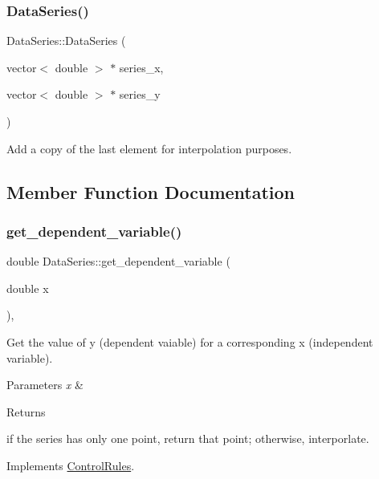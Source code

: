 \subsubsection{\texorpdfstring{Data\+Series()}{DataSeries()}}
{\footnotesize\ttfamily Data\+Series\+::\+Data\+Series (\begin{DoxyParamCaption}\item[{vector$<$ double $>$ $\ast$}]{series\+\_\+x,  }\item[{vector$<$ double $>$ $\ast$}]{series\+\_\+y }\end{DoxyParamCaption})}

Add a copy of the last element for interpolation purposes. 

\subsection{Member Function Documentation}
\mbox{\label{classDataSeries_a3cb684ebcbdd6d9969996f306bed8b53}} 
\subsubsection{\texorpdfstring{get\+\_\+dependent\+\_\+variable()}{get\_dependent\_variable()}\hspace{0.1cm}{\footnotesize\ttfamily [1/2]}}
{\footnotesize\ttfamily double Data\+Series\+::get\+\_\+dependent\+\_\+variable (\begin{DoxyParamCaption}\item[{double}]{x }\end{DoxyParamCaption})\hspace{0.3cm}{\ttfamily [override]}, {\ttfamily [virtual]}}

Get the value of y (dependent vaiable) for a corresponding x (independent variable). 
\begin{DoxyParams}{Parameters}
{\em x} & \\
\hline
\end{DoxyParams}
\begin{DoxyReturn}{Returns}

\end{DoxyReturn}
if the series has only one point, return that point; otherwise, interporlate. 

Implements \mbox{\hyperlink{classControlRules}{Control\+Rules}}.

